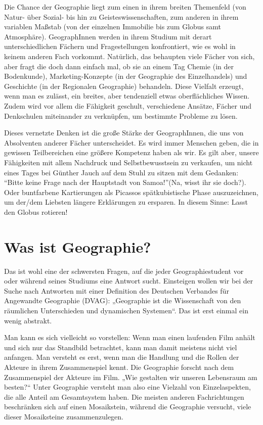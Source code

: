 Die Chance der Geographie liegt zum einen in ihrem breiten Themenfeld (von Natur- über Sozial- bis hin zu Geisteswissenschaften, zum anderen in ihrem variablen Maßstab (von der einzelnen Immobilie bis zum Globus samt Atmosphäre). GeographInnen werden in ihrem Studium mit derart unterschiedlichen Fächern und Fragestellungen konfrontiert, wie es wohl in keinem anderen Fach vorkommt. Natürlich, das behaupten viele Fächer von sich, aber fragt die doch dann einfach mal, ob sie an einem Tag Chemie (in der Bodenkunde), Marketing-Konzepte (in der Geographie des Einzelhandels) und Geschichte (in der Regionalen Geographie) behandeln. Diese Vielfalt erzeugt, wenn man es zulässt, ein breites, aber tendenziell etwas oberflächliches Wissen. Zudem wird vor allem die Fähigkeit geschult, verschiedene Ansätze, Fächer und Denkschulen miteinander zu verknüpfen, um bestimmte Probleme zu lösen.

Dieses vernetzte Denken ist die große Stärke der GeographInnen, die uns von Absolventen anderer Fächer unterscheidet. Es wird immer Menschen geben, die in gewissen Teilbereichen eine größere Kompetenz haben als wir. Es gilt aber, unsere Fähigkeiten mit allem Nachdruck und Selbstbewusstsein zu verkaufen, um nicht eines Tages bei Günther Jauch auf dem Stuhl zu sitzen mit dem Gedanken: "`Bitte keine Frage nach der Hauptstadt von Samoa!"'(Na, wisst ihr sie doch?). Oder buntfarbene Kartierungen als Picassos spätkubistische Phase auszuzeichnen, um der/dem Liebsten längere Erklärungen zu ersparen. In diesem Sinne: Lasst den Globus rotieren!

\section*{Was ist Geographie?}
Das ist wohl eine der schwersten Fragen, auf die jeder Geographiestudent vor oder während seines Studiums eine Antwort sucht. Einsteigen wollen wir bei der Suche nach Antworten mit einer Deﬁnition des Deutschen Verbandes für Angewandte Geographie (DVAG): „Geographie ist die Wissenschaft von den räumlichen Unterschieden und dynamischen Systemen“. Das ist erst einmal ein wenig abstrakt.

Man kann es sich vielleicht so vorstellen: Wenn man einen laufenden Film anhält und sich nur das Standbild betrachtet, kann man damit meistens nicht viel anfangen. Man versteht es erst, wenn man die Handlung und die Rollen der Akteure in ihrem Zusammenspiel kennt. Die Geographie forscht nach dem Zusammenspiel der Akteure im Film. „Wie gestalten wir unseren Lebensraum am besten?“ Unter Geographie versteht man also eine Vielzahl von Einzelaspekten, die alle Anteil am Gesamtsystem haben. Die meisten anderen Fachrichtungen beschränken sich auf einen Mosaikstein, während die Geographie versucht, viele dieser Mosaiksteine zusammenzulegen.

